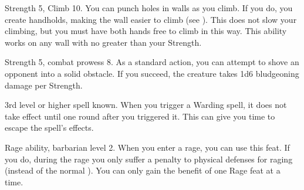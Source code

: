 \featpres Strength 5, Climb 10.
\featben You can punch holes in walls as you climb.
If you do, you create handholds, making the wall easier to climb (see ).
This does not slow your climbing, but you must have both hands free to climb in this way.
This ability works on any wall with  no greater than your Strength.

\featpres Strength 5, combat prowess 8.
\featben As a standard action, you can attempt to shove an opponent into a solid obstacle.
If you succeed, the creature takes 1d6 bludgeoning damage per Strength.

\featpre 3rd level or higher  spell known.
\featben When you trigger a Warding spell, it does not take effect until one round after you triggered it. This can give you time to escape the spell's effects.

\featpre Rage ability, barbarian level 2.
\featben When you enter a rage, you can use this feat. If you do, during the rage you only suffer a  penalty to physical defenses for raging (instead of the normal ).
 You can only gain the benefit of one Rage feat at a time.

